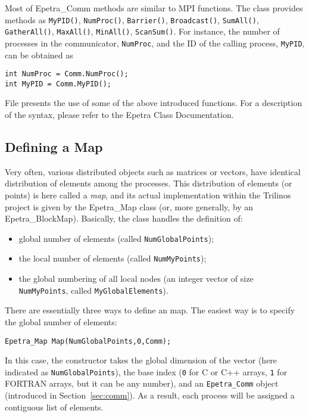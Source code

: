 Most of Epetra\_Comm methods are similar to MPI functions. The class
provides methods as \verb!MyPID()!, \verb!NumProc()!, \verb!Barrier()!,
\verb!Broadcast()!, \verb!SumAll()!, \verb!GatherAll()!,
\verb!MaxAll()!, \verb!MinAll()!, \verb!ScanSum()!.  For instance, the
number of processes in the communicator, \verb!NumProc!, and the ID of
the calling process, \verb!MyPID!, can be obtained as
\begin{verbatim}
int NumProc = Comm.NumProc();
int MyPID = Comm.MyPID();
\end{verbatim}

File  presents the use of some of the above
introduced functions.  For a description of the syntax, please refer to
the Epetra Class Documentation.


\subsection{Defining a Map}
\label{sec:map}

Very often, various distributed objects such as matrices or vectors,
have identical distribution of elements among the processes.  This
distribution of elements (or points) is here called a {\sl map}, and its
actual implementation within the Trilinos project is given by the
Epetra\_Map class (or, more generally, by an Epetra\_BlockMap).
Basically, the class handles the definition of:
\begin{itemize}
\item global number of elements (called \verb!NumGlobalPoints!);
\item the local number of elements (called \verb!NumMyPoints!);
\item the global numbering of all local nodes (an integer vector of size
  \verb!NumMyPoints!, called \verb!MyGlobalElements!).
\end{itemize}

There are essentially three ways to define an map. The easiest way is to
specify the global number of elements:
\begin{verbatim}
Epetra_Map Map(NumGlobalPoints,0,Comm);
\end{verbatim}
In this case, the constructor takes the global dimension of the vector
(here indicated as \verb!NumGlobalPoints!), the base index (\verb!0! for
C or C++ arrays, \verb!1! for FORTRAN arrays, but it can be any number),
and an \verb!Epetra_Comm!  object (introduced in
Section~\ref{sec:comm}). As a result, each process will be assigned a
contiguous list of elements.

